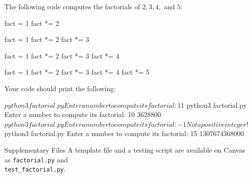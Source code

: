 \documentclass[11pt]{cselabheader}
\begin{document}
{\begin{ex}[factorial.py]
The following code computes the factorials of $2, 3, 4,$ and $5$:

\begin{multicols}{4}
\begin{python3code}
fact = 1
fact *= 2
\end{python3code}
\columnbreak
\begin{python3code}
fact = 1
fact *= 2
fact *= 3
\end{python3code}
\columnbreak
\begin{python3code}
fact = 1
fact *= 2
fact *= 3
fact *= 4
\end{python3code}
\columnbreak
\begin{python3code}
fact = 1
fact *= 2
fact *= 3
fact *= 4
fact *= 5
\end{python3code}
\end{multicols}

Your code should print the following:

\begin{bashcode}
$ python3 factorial.py
Enter a number to compute its factorial: 1
1
$ python3 factorial.py
Enter a number to compute its factorial: 10
3628800
$ python3 factorial.py
Enter a number to compute its factorial: -1
Not a positive integer!
$ python3 factorial.py
Enter a number to compute its factorial: 15
1307674368000
\end{bashcode}

\end{ex}

\begin{infobox}{Supplementary Files}
A template file and a testing script are available on Canvas as \texttt{factorial.py} and
\\ %
\texttt{test\_factorial.py}.
\end{infobox}

%
%
%

}
\end{document}
